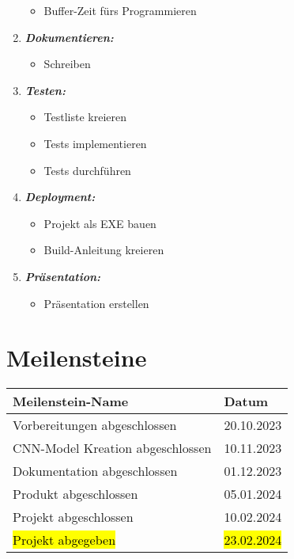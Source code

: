 \begin{enumerate}
\begin{itemize}
		\item Buffer-Zeit fürs Programmieren 
	\end{itemize} 
	\item \textbf{\emph{Dokumentieren:}} 
	\begin{itemize} 
		\item Schreiben 
	\end{itemize} 
	\item \textbf{\emph{Testen:}} 
	\begin{itemize} 
		\item Testliste kreieren 
		\item Tests implementieren 
		\item Tests durchführen 
	\end{itemize} 
	\item \textbf{\emph{Deployment:}} 
	\begin{itemize} 
		\item Projekt als EXE bauen 
		\item Build-Anleitung kreieren 
	\end{itemize} 
	\item \textbf{\emph{Präsentation:}} 
	\begin{itemize} 
		\item Präsentation erstellen 
	\end{itemize}
\end{enumerate} 
\section{Meilensteine} 
\label{sec:PlanungMeilensteine} 

\begin{xltabular}{\linewidth}{|X|X|} 
	\hline Meilenstein-Name & Datum 
	\\\hline Vorbereitungen abgeschlossen & 20.10.2023 
	\\\hline CNN-Model Kreation abgeschlossen & 10.11.2023 
	\\\hline Dokumentation abgeschlossen & 01.12.2023 
	\\\hline Produkt abgeschlossen & 05.01.2024 
	\\\hline Projekt abgeschlossen & 10.02.2024 
	\\\hline \hl{Projekt abgegeben} & \hl{23.02.2024} 
	\\\hline 
\end{xltabular}

\label{tab:PlanungMeilensteineTable}

